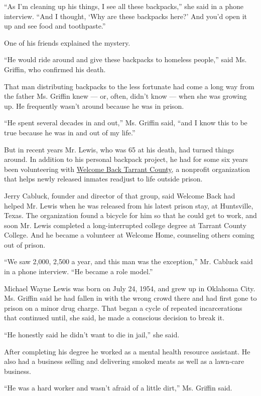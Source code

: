 ``As I'm cleaning up his things, I see all these backpacks,'' she said
in a phone interview. ``And I thought, `Why are these backpacks here?'
And you'd open it up and see food and toothpaste.''

One of his friends explained the mystery.

``He would ride around and give these backpacks to homeless people,''
said Ms. Griffin, who confirmed his death.

That man distributing backpacks to the less fortunate had come a long
way from the father Ms. Griffin knew --- or, often, didn't know --- when
she was growing up. He frequently wasn't around because he was in
prison.

``He spent several decades in and out,'' Ms. Griffin said, ``and I know
this to be true because he was in and out of my life.''

But in recent years Mr. Lewis, who was 65 at his death, had turned
things around. In addition to his personal backpack project, he had for
some six years been volunteering with
\href{https://www.facebookcorewwwi.onion/WelcomeBackTC/}{Welcome Back
Tarrant County}, a nonprofit organization that helps newly released
inmates readjust to life outside prison.

Jerry Cabluck, founder and director of that group, said Welcome Back had
helped Mr. Lewis when he was released from his latest prison stay, at
Huntsville, Texas. The organization found a bicycle for him so that he
could get to work, and soon Mr. Lewis completed a long-interrupted
college degree at Tarrant County College. And he became a volunteer at
Welcome Home, counseling others coming out of prison.

``We saw 2,000, 2,500 a year, and this man was the exception,'' Mr.
Cabluck said in a phone interview. ``He became a role model.''

Michael Wayne Lewis was born on July 24, 1954, and grew up in Oklahoma
City. Ms. Griffin said he had fallen in with the wrong crowd there and
had first gone to prison on a minor drug charge. That began a cycle of
repeated incarcerations that continued until, she said, he made a
conscious decision to break it.

``He honestly said he didn't want to die in jail,'' she said.

After completing his degree he worked as a mental health resource
assistant. He also had a business selling and delivering smoked meats as
well as a lawn-care business.

``He was a hard worker and wasn't afraid of a little dirt,'' Ms. Griffin
said.

